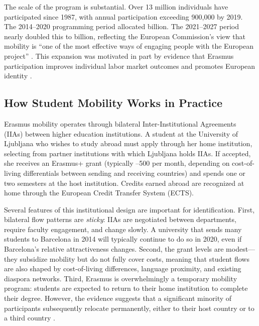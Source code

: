 \documentclass[12pt]{article}
\begin{document}
The scale of the program is substantial. Over 13 million individuals have participated since 1987, with annual participation exceeding 900,000 by 2019. The 2014--2020 programming period allocated  billion. The 2021--2027 period nearly doubled this to  billion, reflecting the European Commission's view that mobility is ``one of the most effective ways of engaging people with the European project'' \citep{european_commission_2021}. This expansion was motivated in part by evidence that Erasmus participation improves individual labor market outcomes \citep{di_pietro_2015, parey_waldinger_2011} and promotes European identity \citep{di_pietro_2019}.

\subsection{How Student Mobility Works in Practice}

Erasmus mobility operates through bilateral Inter-Institutional Agreements (IIAs) between higher education institutions. A student at the University of Ljubljana who wishes to study abroad must apply through her home institution, selecting from partner institutions with which Ljubljana holds IIAs. If accepted, she receives an Erasmus+ grant (typically --500 per month, depending on cost-of-living differentials between sending and receiving countries) and spends one or two semesters at the host institution. Credits earned abroad are recognized at home through the European Credit Transfer System (ECTS).

Several features of this institutional design are important for identification. First, bilateral flow patterns are \emph{sticky}: IIAs are negotiated between departments, require faculty engagement, and change slowly. A university that sends many students to Barcelona in 2014 will typically continue to do so in 2020, even if Barcelona's relative attractiveness changes. Second, the grant levels are modest---they subsidize mobility but do not fully cover costs, meaning that student flows are also shaped by cost-of-living differences, language proximity, and existing diaspora networks. Third, Erasmus is overwhelmingly a temporary mobility program: students are expected to return to their home institution to complete their degree. However, the evidence suggests that a significant minority of participants subsequently relocate permanently, either to their host country or to a third country \citep{oosterbeek_webbink_2011, sorrenti_2025}.
\end{document}
